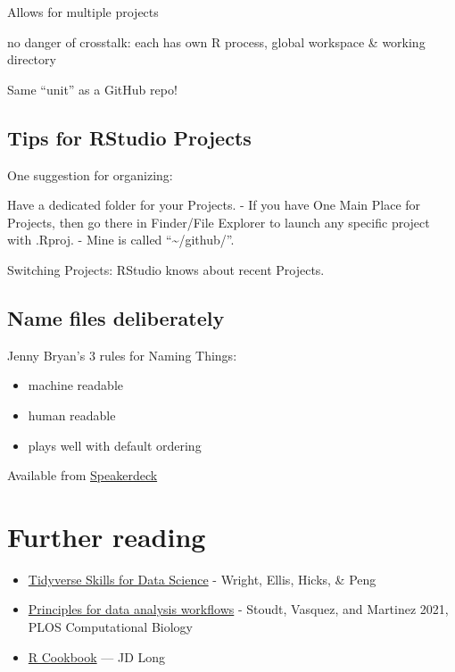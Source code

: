 \documentclass[
  letterpaper,
  DIV=11,
  numbers=noendperiod]{scrreprt}
\providecommand{\tightlist}{%
  \setlength{\itemsep}{0pt}\setlength{\parskip}{0pt}}
\begin{document}
Allows for multiple projects

no danger of crosstalk: each has own R process, global workspace \&
working directory

Same ``unit'' as a GitHub repo!

\hypertarget{tips-for-rstudio-projects}{%
\subsection{Tips for RStudio Projects}\label{tips-for-rstudio-projects}}

One suggestion for organizing:

Have a dedicated folder for your Projects. - If you have One Main Place
for Projects, then go there in Finder/File Explorer to launch any
specific project with .Rproj. - Mine is called
``\textasciitilde/github/''.

Switching Projects: RStudio knows about recent Projects.

\hypertarget{name-files-deliberately}{%
\subsection{Name files deliberately}\label{name-files-deliberately}}

Jenny Bryan's 3 rules for Naming Things:

\begin{itemize}
\tightlist
\item
  machine readable
\item
  human readable
\item
  plays well with default ordering
\end{itemize}

Available from
\href{https://speakerdeck.com/jennybc/how-to-name-files}{Speakerdeck}

\hypertarget{further-reading-2}{%
\section{Further reading}\label{further-reading-2}}

\begin{itemize}
\tightlist
\item
  \href{https://jhudatascience.org/tidyversecourse/}{Tidyverse Skills
  for Data Science} - Wright, Ellis, Hicks, \& Peng
\item
  \href{https://journals.plos.org/ploscompbiol/article?id=10.1371/journal.pcbi.1008770}{Principles
  for data analysis workflows} - Stoudt, Vasquez, and Martinez 2021,
  PLOS Computational Biology
\item
  \href{https://rc2e.com/}{R Cookbook} --- JD Long
\end{itemize}
\end{document}

